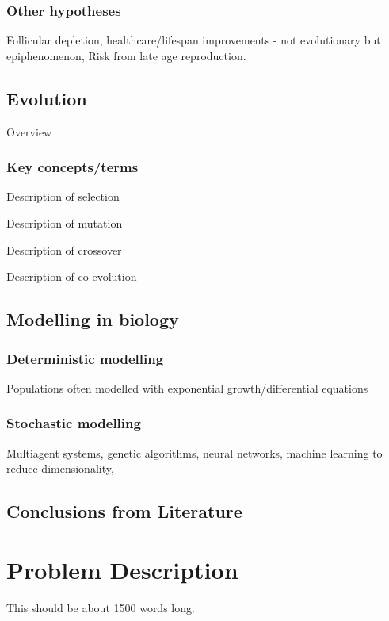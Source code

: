 \documentclass[authoryearcitations]{UoYCSproject}
\begin{document}
\subsection{Other hypotheses}
Follicular depletion, healthcare/lifespan improvements - not evolutionary but epiphenomenon, Risk from late age reproduction.

\section{Evolution}
Overview \cite{origin1859}

\subsection{Key concepts/terms}
\begin{description}[style=nextline]
\item[Selection] Description of selection

\item [Mutation] Description of mutation

\item [Crossover] Description of crossover

\item [Coevolution] Description of co-evolution
\end{description}


\section{Modelling in biology}


\subsection{Deterministic modelling}
Populations often modelled with exponential growth/differential equations

\subsection{Stochastic modelling}
Multiagent systems, genetic algorithms, neural networks, machine learning to reduce dimensionality,

\section{Conclusions from Literature}


\chapter{Problem Description}
\label{cha:Problem Description}
This should be about 1500 words long.
\end{document}
